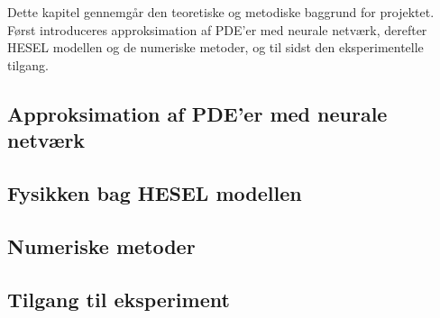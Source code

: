 Dette kapitel gennemgår den teoretiske og metodiske baggrund for projektet.
Først introduceres approksimation af PDE'er med neurale netværk, derefter HESEL modellen og de numeriske metoder, og til sidst den eksperimentelle tilgang.

\subsection{Approksimation af PDE'er med neurale netværk}\label{ch2_1}


\subsection{Fysikken bag HESEL modellen} \label{ch2_2}


\subsection{Numeriske metoder} \label{ch2_3}



\subsection{Tilgang til eksperiment} \label{ch2_5}

